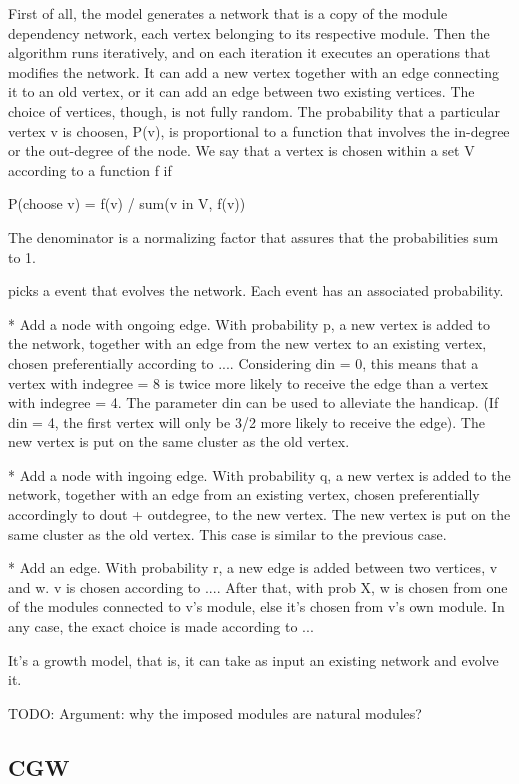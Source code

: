 First of all, the model generates a network that is a copy of the module
dependency network, each vertex belonging to its respective module. Then the
algorithm runs iteratively, and on each iteration it executes an operations that
modifies the network. It can add a new vertex together with an edge connecting it
to an old vertex, or it can add an edge between two existing vertices. The
choice of vertices, though, is not fully random. The probability that a
particular vertex v is choosen, P(v), is proportional to a function that involves the
in-degree or the out-degree of the node. We say that a vertex is chosen within a
set V according to a function f if

P(choose v) = f(v) / sum(v in V, f(v))

The denominator is a normalizing factor that assures that the probabilities sum
to 1.

picks a event that evolves
the network. Each event has an associated probability.

* Add a node with ongoing edge. With probability p, a new vertex is added to the network, together with an
edge from the new vertex to an existing vertex, chosen preferentially according
to .... Considering din = 0, this means that a vertex with indegree = 8 is
twice more likely to receive the edge than a vertex with indegree = 4. The
parameter din can be used to alleviate the handicap. (If din = 4, the first
vertex will only be 3/2 more likely to receive the edge). The new vertex is
put on the same cluster as the old vertex.

* Add a node with ingoing edge. With probability q, a new vertex is added to the network, together with an
edge from an existing vertex, chosen preferentially accordingly to dout +
outdegree, to the new vertex. The new vertex is put on the same cluster as the
old vertex. This case is similar to the previous case.

* Add an edge. With probability r, a new edge is added between two vertices, v and w. v is
chosen according to .... After that, with prob X, w is chosen from one of the
modules connected to v's module, else it's chosen from v's own module. In any
case, the exact choice is made according to ...

It's a growth model, that is, it can take as input an existing network and
evolve it.

TODO: Argument: why the imposed modules are natural modules?

\subsection{CGW}

